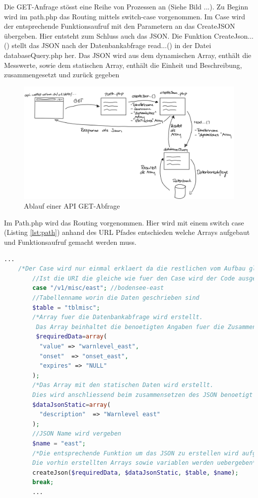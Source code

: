 Die GET-Anfrage stösst eine Reihe von Prozessen an (Siehe Bild ...). Zu Beginn wird im path.php das Routing mittels switch-case vorgenommen. Im Case wird der entsprechende Funktionsaufruf mit den Parametern an das CreateJSON übergeben. Hier entsteht zum Schluss auch das JSON. Die Funktion CreateJson...() stellt das JSON nach der Datenbankabfrage read...() in der Datei databaseQuery.php her. Das JSON wird aus dem dynamischen Array, enthält die Messwerte, sowie dem statischen Array, enthält die Einheit und Beschreibung, zusammengesetzt und zurück gegeben 
\begin{figure}[h!]
	\centering
	\includegraphics[width=0.5\linewidth]{img/API_GET.jpg}
	\caption{Ablauf einer API GET-Abfrage}
	\label{img:APIFiles}
\end{figure}

Im Path.php wird das Routing vorgenommen. Hier wird mit einem switch case (Listing \ref{lst:path}) anhand des URL Pfades entschieden welche Arrays aufgebaut und Funktionsaufruf gemacht werden muss. 

\begin{lstlisting}[label=lst:path,caption=Beispiel Case zuweisung, language=php, style=php]
	...    
    /*Der Case wird nur einmal erklaert da die restlichen vom Aufbau gleich sind*/
        //Ist die URI die gleiche wie fuer den Case wird der Code ausgefuehrt
        case "/v1/misc/east"; //bodensee-east
        //Tabellenname worin die Daten geschrieben sind
        $table = "tblmisc";
        /*Array fuer die Datenbankabfrage wird erstellt.
         Das Array beinhaltet die benoetigten Angaben fuer die Zusammensetzung*/
         $requiredData=array(
          "value" => "warnlevel_east",
          "onset"  => "onset_east",
          "expires" => "NULL"
        );
        /*Das Array mit den statischen Daten wird erstellt.
        Dies wird anschliessend beim zusammensetzen des JSON benoetigt */
        $dataJsonStatic=array(
          "description"  => "Warnlevel east"
        );
        //JSON Name wird vergeben
        $name = "east";
        /*Die entsprechende Funktion um das JSON zu erstellen wird aufgerufen.
        Die vorhin erstellten Arrays sowie variablen werden uebergeben*/
        createJson($requiredData, $dataJsonStatic, $table, $name);
        break;
        ...
\end{lstlisting}



